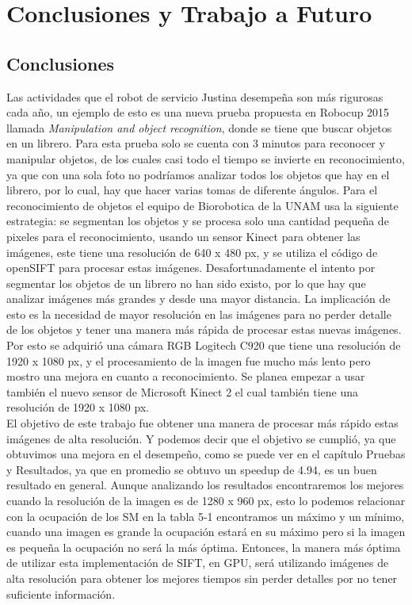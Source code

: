 \chapter{Conclusiones y Trabajo a Futuro}
\section{Conclusiones}
Las actividades que el robot de servicio Justina desempeña son más rigurosas cada año, un ejemplo de esto es una nueva prueba propuesta en Robocup 2015 llamada \textit{Manipulation and object recognition}, donde se tiene que buscar objetos en un librero. Para esta prueba solo se cuenta con 3 minutos para reconocer y manipular objetos,  de los cuales casi todo el tiempo se invierte en reconocimiento, ya que con una sola foto no podríamos analizar todos los objetos que  hay en el librero, por lo cual, hay que hacer varias tomas de diferente ángulos. Para el reconocimiento de objetos el equipo de Biorobotica de la UNAM usa la siguiente estrategia: se segmentan los objetos y se procesa solo una cantidad pequeña de pixeles para el reconocimiento, usando un sensor Kinect para obtener las imágenes, este tiene una resolución de  640 x 480 px, y se utiliza el código de openSIFT para procesar estas imágenes. Desafortunadamente el intento por segmentar los objetos de un librero no han sido existo, por lo que hay que analizar imágenes más grandes y desde una mayor distancia. La implicación de esto es la necesidad de mayor resolución en las imágenes para no perder detalle de los objetos y tener una manera más rápida de procesar estas nuevas imágenes. Por esto se adquirió una cámara RGB Logitech C920 que tiene una resolución de 1920 x 1080 px, y el procesamiento de la imagen fue mucho más lento pero mostro una mejora en cuanto a reconocimiento. Se planea empezar a usar también el nuevo sensor de Microsoft Kinect 2 el cual también tiene una resolución de 1920 x 1080 px.\\
El objetivo de este trabajo fue obtener una manera de procesar más rápido estas imágenes de alta resolución. Y podemos decir que el objetivo se cumplió, ya que obtuvimos una mejora en el desempeño, como se puede ver en el capítulo Pruebas y Resultados, ya que en promedio se obtuvo un speedup de 4.94, es un buen resultado en general. Aunque analizando los resultados encontraremos los mejores cuando la resolución de la imagen es de 1280 x 960 px, esto lo podemos relacionar con la ocupación de los SM en la tabla 5-1 encontramos un máximo y un mínimo, cuando una imagen es grande la ocupación estará en su máximo pero si la imagen es pequeña la ocupación no será la más óptima. Entonces, la manera más óptima de utilizar esta implementación de SIFT, en GPU, será utilizando imágenes de alta resolución para obtener los mejores tiempos sin perder detalles por no tener suficiente información.      
